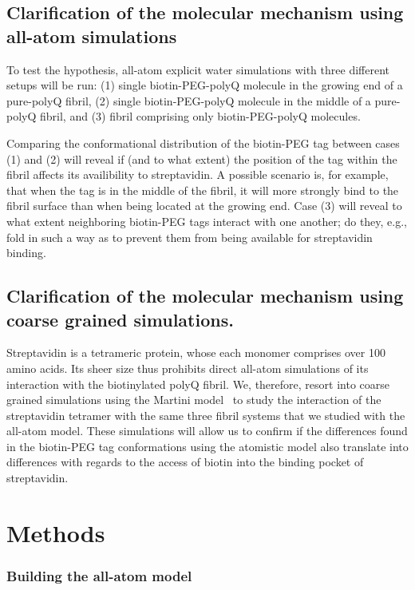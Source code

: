 \documentclass[a4paper,11pt,floatfix,authordate1-4,twocolumn]{revtex4-1}
\begin{document}
\subsection{Clarification of the molecular mechanism using all-atom simulations}
To test the hypothesis, all-atom explicit water simulations
with three different setups will be run:
(1) single biotin-PEG-polyQ molecule in the growing end of a pure-polyQ fibril,
(2) single biotin-PEG-polyQ molecule in the middle of a pure-polyQ fibril, and
(3) fibril comprising only biotin-PEG-polyQ molecules.

Comparing the conformational distribution of the biotin-PEG tag between cases (1) and (2) will reveal
if (and to what extent) the position of the tag within the fibril affects its availibility
to strept\-avidin. A possible scenario is, for example, that when the tag is in the middle of the
fibril, it will more strongly bind to the fibril surface than
when being located at the growing end.
%
Case (3) will reveal to what extent neighboring biotin-PEG tags interact with one another;
do they, e.g.,
fold in such a way as to prevent them from being available for streptavidin
binding.

\subsection{Clarification of the molecular mechanism using coarse grained simulations.}
Streptavidin is a tetrameric protein, whose each monomer comprises over 100 amino acids.
Its sheer size thus prohibits direct all-atom simulations of
its interaction with the biotinylated polyQ fibril.
%
We, therefore, resort into coarse grained simulations using the Martini model~\cite{Marrink:2007a}
to study the interaction of the streptavidin tetramer with
the same three fibril systems that we studied with the all-atom model.
%
These simulations will allow us to confirm if the differences found in
the biotin-PEG tag conformations using the atomistic model also
translate into differences with regards to the access of biotin into the binding
pocket of streptavidin.

\section{Methods}

\subsubsection*{Building the all-atom model}
\end{document}
